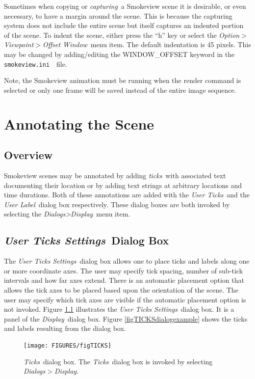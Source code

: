\documentclass[11pt,twoside]{book}
\newcommand{\svini}{{\tt smokeview.ini}\ }
\begin{document}
Sometimes when copying or {\em capturing}\ a Smokeview scene it is
desirable, or even necessary, to have a margin around the scene.
This is because the capturing system does not include the entire
scene but itself captures an indented portion of the scene. To
indent the scene, either press the ``h'' key or select the {\em
Option$>$Viewpoint$>$Offset Window}\ menu item. The default
indentation is 45 pixels. This may be changed by adding/editing
the WINDOW\_OFFSET keyword in the \svini\ file.

Note, the Smokeview animation must be running when the render command is selected or only one frame will be saved instead of the entire image sequence.

\chapter{Annotating the Scene }
\label{section:annotate} \label{subsect_features}
\section{Overview}
Smokeview scenes may be annotated by adding {\em ticks}\ with associated text documenting their location
or by adding text strings at arbitrary locations and time durations.  Both of these annotations
are added with the {\em User Ticks}\ and the {\em User Label}\ dialog
box respectively.  These dialog boxes are both invoked by selecting the {\em Dialogs>Display}\ menu item.

\section{{\em User Ticks Settings}\ Dialog Box}
The {\em User Ticks Settings}\ dialog box allows one to place
ticks and labels along one or more coordinate axes. The
user may specify tick spacing, number of sub-tick intervals and
how far axes extend.  There is an automatic placement option that
allows the tick axes to be placed based upon the orientation of
the scene.  The user may specify which tick axes are visible if
the automatic placement option is not invoked.  Figure
\ref{figTICKSdialog} illustrates the {\em User Ticks Settings}\
dialog box.  It is a panel of the {\em Display}\ dialog box.
Figure \ref{figTICKSdialogexample} shows the ticks and labels
resulting from the dialog box.

\begin{figure}[\figoptions]
\centerline{
\texttt{[image: FIGURES/figTICKS]}
} \caption[{\em Ticks}\ dialog box.]{{\em Ticks}\ dialog box. The
{\em Ticks}\ dialog box is invoked by selecting {\em
Dialogs$>$Display}. } \label{figTICKSdialog}
\end{figure}
\end{document}
